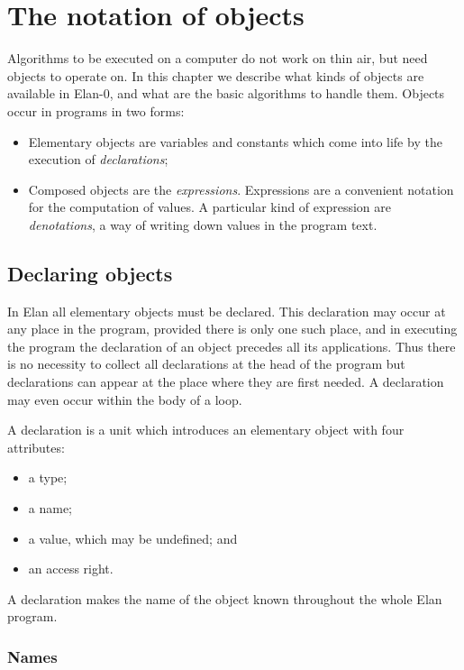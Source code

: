 \section{The notation of objects}

Algorithms to be executed on a computer do not work on thin
air, but need objects to operate on. In this chapter we describe
what kinds of objects are available in Elan-0, and what are the
basic algorithms to handle them.
Objects occur in programs in two forms:

\begin{itemize}
\item Elementary objects are variables and constants which come
into life by the execution of {\em declarations};
\item Composed objects are the {\em expressions}. Expressions
are a convenient notation for the computation of values. A
particular kind of expression are {\em denotations}, a way of
writing down values in the program text.
\end{itemize}

\subsection{Declaring objects}

In Elan all elementary objects must be declared. This declaration
may occur at any place in the program, provided there is only
one such place, and in executing the program the declaration
of an object precedes all its applications. Thus there is no
necessity to collect all declarations at the head of the program
but declarations can appear at the place where they are first
needed. A declaration may even occur within the body of a loop.

A declaration is a unit which introduces an elementary object
with four attributes:

\begin{itemize}
\item a type;
\item a name;
\item a value, which may be undefined; and
\item an access right.
\end{itemize}

\noindent
A declaration makes the name of the object known throughout the
whole Elan program.

\subsubsection{Names}

